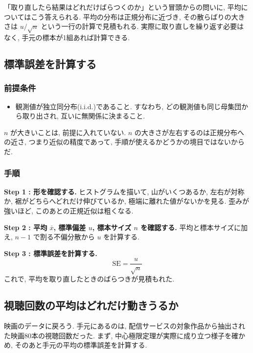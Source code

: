     「取り直したら結果はどれだけばらつくのか」という冒頭からの問いに, 平均についてはこう答えられる.
    平均の分布は正規分布に近づき, その散らばりの大きさは $u/\sqrt{n}$ という一行の計算で見積もれる.
    実際に取り直しを繰り返す必要はなく, 手元の標本が1組あれば計算できる.

  \subsection{標準誤差を計算する}

    \subsubsection*{前提条件}
    \begin{itemize}
      \item 観測値が独立同分布(i.i.d.)であること. すなわち, どの観測値も同じ母集団から取り出され, 互いに無関係に決まること.
    \end{itemize}

    $n$ が大きいことは, 前提に入れていない.
    $n$ の大きさが左右するのは正規分布への近さ, つまり近似の精度であって, 手順が使えるかどうかの境目ではないからだ.

    \subsubsection*{手順}

    \textbf{Step 1 : 形を確認する.}
    ヒストグラムを描いて, 山がいくつあるか, 左右が対称か, 裾がどちらへどれだけ伸びているか, 極端に離れた値がないかを見る.
    歪みが強いほど, このあとの正規近似は粗くなる.

    \textbf{Step 2 : 平均 $\bar{x}$, 標準偏差 $u$, 標本サイズ $n$ を確認する.}
    平均と標本サイズに加え, $n-1$ で割る不偏分散から $u$ を計算する.

    \textbf{Step 3 : 標準誤差を計算する.}
    \[
      \mathrm{SE} = \frac{u}{\sqrt{n}}
    \]
    これで, 平均を取り直したときのばらつきが見積もれた.

  \subsection{視聴回数の平均はどれだけ動きうるか}

    映画のデータに戻ろう.
    手元にあるのは, 配信サービスの対象作品から抽出された映画80本の視聴回数だった.
    まず, 中心極限定理が実際に成り立つ様子を確かめ, そのあと手元の平均の標準誤差を計算する.

